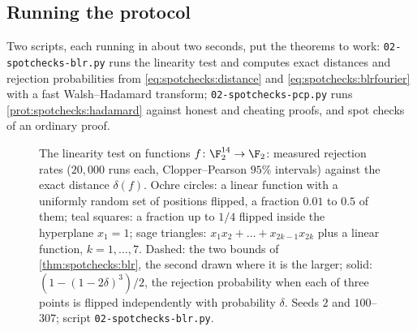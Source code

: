 \begin{refsection}
\section{Running the protocol}\label{sec:spotchecks:running}

Two scripts, each running in about two seconds, put the theorems to work: \texttt{02-\allowbreak spotchecks-\allowbreak blr.py} runs the linearity test and computes exact distances and rejection probabilities from \eqref{eq:spotchecks:distance} and \eqref{eq:spotchecks:blrfourier} with a fast Walsh--Hadamard transform; \texttt{02-\allowbreak spotchecks-\allowbreak pcp.py} runs \cref{prot:spotchecks:hadamard} against honest and cheating proofs, and spot checks of an ordinary proof.

\begin{figure}[t]
\centering
{}
\caption{The linearity test on functions $f\colon\F_2^{14}\to\F_2$: measured rejection rates ($20{,}000$ runs each, Clopper--Pearson $95\%$ intervals) against the exact distance $\delta(f)$. Ochre circles: a linear function with a uniformly random set of positions flipped, a fraction $0.01$ to $0.5$ of them; teal squares: a fraction up to $1/4$ flipped inside the hyperplane $x_1=1$; sage triangles: $x_1x_2+\dots+x_{2k-1}x_{2k}$ plus a linear function, $k=1,\dots,7$. Dashed: the two bounds of \cref{thm:spotchecks:blr}, the second drawn where it is the larger; solid: $(1-(1-2\delta)^3)/2$, the rejection probability when each of three points is flipped independently with probability $\delta$. Seeds $2$ and $100$--$307$; script \texttt{02-\allowbreak spotchecks-\allowbreak blr.py}.}
\label{fig:spotchecks:blr}
\end{figure}


\end{refsection}

